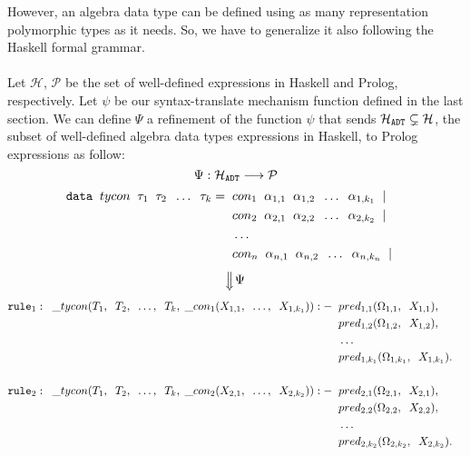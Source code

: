 	However, an algebra data type can be defined using as many representation polymorphic types as it needs. So, we have to generalize it also following the Haskell formal grammar.\\\\
	Let $\mathcal{H}$, $\mathcal{P}$ be the set of well-defined expressions in Haskell and Prolog, respectively. Let $\psi$ be our syntax-translate mechanism function defined in the last section. We can define $\Psi$ a refinement of the function $\psi$ that sends $\mathcal{H}_{\texttt{ADT}} \subsetneq \mathcal{H}$, the subset of well-defined algebra data types expressions in Haskell, to Prolog expressions as follow: $$\Psi: \mathcal{H}_{\texttt{ADT}} \longrightarrow \mathcal{P} $$
	\begin{align*}
		\texttt{data} \;\; tycon \;\; \tau_1 \;\; \tau_2 \;\; \ldots \;\; \tau_k 	= & \;\; con_1 \;\; \alpha_{1,1} \;\; \alpha_{1,2} \;\; \ldots \;\; \alpha_{1,k_1} \;\; | &   &   \\
		                                                                         & \;\; con_2 \;\; \alpha_{2,1} \;\; \alpha_{2,2} \;\; \ldots \;\; \alpha_{2,k_2} \;\; | &   &   \\
		                                                                         & \;\; \ldots \;\;                                                                      &   &   \\
		                                                                         & \;\; con_n \;\; \alpha_{n,1} \;\; \alpha_{n,2} \;\; \ldots \;\; \alpha_{n,k_n} \;\; | &   &   \\
	\end{align*}
	$$\SLongdownarrow \Psi$$
	\begin{align*}
		\texttt{rule}_1: \;\; \_ tycon (T_1, \;\; T_2, \;\; \ldots, \;\; T_k, \; \_ con_1(X_{1,1}, \;\; \ldots, \;\; X_{1,k_1})) :-&
		\;\; pred_{1, 1}(\Omega_{1,1}, \;\; X_{1,1}), && \\
		  & \;\; pred_{1, 2}(\Omega_{1,2}, \;\; X_{1,2}),       &   &   \\
		  & \;\; \ldots \;\;                                    &   &   \\
		  & \;\; pred_{1, k_1}(\Omega_{1,k_1}, \;\; X_{1,k_1}). &   &   \\
		\\
		\texttt{rule}_2: \;\; \_ tycon (T_1, \;\; T_2, \;\; \ldots, \;\; T_k, \; \_ con_2(X_{2,1}, \;\; \ldots, \;\; X_{2,k_2})) :-&
		\;\; pred_{2, 1}(\Omega_{2,1}, \;\; X_{2,1}), && \\
		  & \;\; pred_{2, 2}(\Omega_{2,2}, \;\; X_{2,2}),       &   &   \\
		  & \;\; \ldots \;\;                                    &   &   \\
		  & \;\; pred_{2, k_2}(\Omega_{2,k_2}, \;\; X_{2,k_2}). &   &   
	\end{align*}
